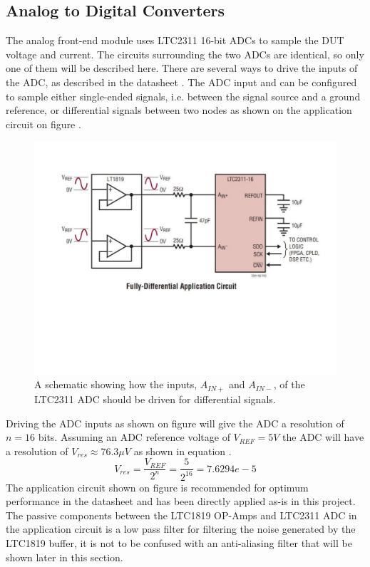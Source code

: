 \subsection{Analog to Digital Converters} \label{subsec:ADCs}
The analog front-end module uses LTC2311\cite{ADC_LTC2311} 16-bit ADCs to sample the DUT voltage and current. The circuits surrounding the two ADCs are identical, so only one of them will be described here. There are several ways to drive the inputs of the ADC, as described in the datasheet \cite{ADC_LTC2311}. 
The ADC input and can be configured to sample either single-ended signals, i.e. between the signal source and a ground reference, or differential signals between two nodes as shown on the application circuit on figure .

\begin{figure}[H]
    \centering
    \includegraphics[clip, trim=0 200 0 50, width=1\textwidth]{Sections/7_SystemDesign/Figures/7_1_ADC_FULLDIFFINPUT.pdf}
    \caption{A schematic showing how the inputs, $A_{IN+}$ and $A_{IN-}$, of the LTC2311 ADC should be driven \cite{ADC_LTC2311} for differential signals.}
    \label{fig_7_1_DRIVEADC}
\end{figure}

Driving the ADC inputs as shown on figure  will give the ADC a resolution of $n = 16$ bits. Assuming an ADC reference voltage of $V_{REF} = 5 V$ the ADC will have a resolution of $V_{res} \approx 76.3 \mu V$ as shown in equation . 
\begin{equation}\label{eq:7_1_2_ADCRES}
    V_{res} = \frac{V_{REF}}{2^n} = \frac{5}{2^{16}} = 7.6294e-5
\end{equation}
The application circuit shown on figure  is recommended for optimum performance in the datasheet and has been directly applied as-is in this project. The passive components between the LTC1819 OP-Amps and LTC2311 ADC in the application circuit is a low pass filter for filtering the noise generated by the LTC1819 buffer, it is not to be confused with an anti-aliasing filter that will be shown later in this section.


